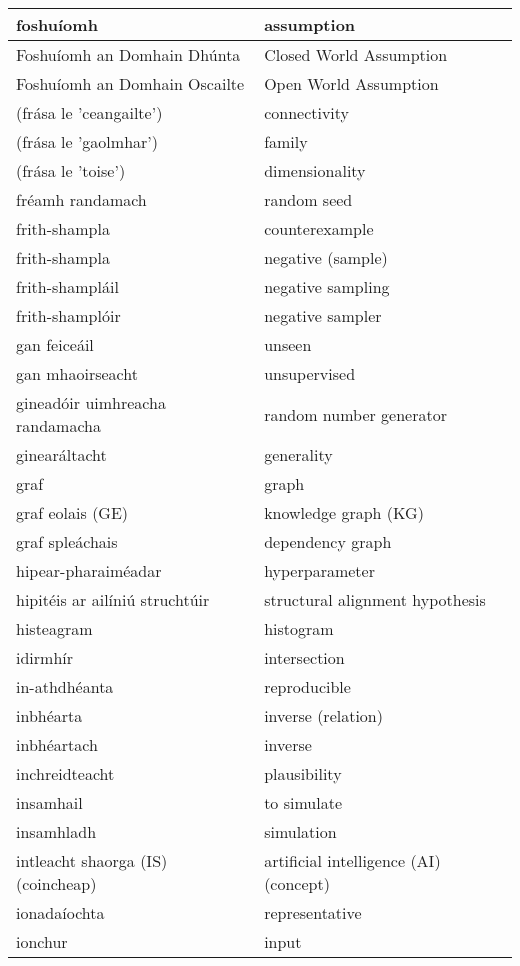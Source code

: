 \begin{longtable}{|l|l|}
		foshuíomh&assumption\\ \hline 
		Foshuíomh an Domhain Dhúnta&Closed World Assumption\\ \hline 
		Foshuíomh an Domhain Oscailte&Open World Assumption\\ \hline 
		(frása le 'ceangailte')&connectivity\\ \hline 
		(frása le 'gaolmhar')&family\\ \hline 
		(frása le 'toise')&dimensionality\\ \hline 
		fréamh randamach&random seed\\ \hline 
		frith-shampla&counterexample\\ \hline 
		frith-shampla&negative (sample)\\ \hline 
		frith-shampláil&negative sampling\\ \hline 
		frith-shamplóir&negative sampler\\ \hline 
		gan feiceáil&unseen\\ \hline 
		gan mhaoirseacht&unsupervised\\ \hline 
		gineadóir uimhreacha randamacha&random number generator\\ \hline 
		ginearáltacht&generality\\ \hline 
		graf&graph\\ \hline 
		graf eolais (GE)&knowledge graph (KG)\\ \hline 
		graf spleáchais&dependency graph\\ \hline 
		hipear-pharaiméadar&hyperparameter\\ \hline 
		hipitéis ar ailíniú struchtúir&structural alignment hypothesis\\ \hline 
		histeagram&histogram\\ \hline 
		idirmhír&intersection\\ \hline 
		in-athdhéanta&reproducible\\ \hline 
		inbhéarta&inverse (relation)\\ \hline 
		inbhéartach&inverse\\ \hline 
		inchreidteacht&plausibility\\ \hline 
		insamhail&to simulate\\ \hline 
		insamhladh&simulation\\ \hline 
		intleacht shaorga (IS) (coincheap)&artificial intelligence (AI) (concept)\\ \hline 
		ionadaíochta&representative\\ \hline 
		ionchur&input\\ \hline 

\end{longtable}
